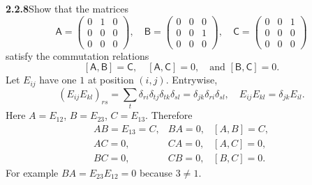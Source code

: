 \par\bigskip
\noindent\textbf{2.2.8}\quad Show that the matrices
\[
\mathsf{A}=\begin{pmatrix}0&1&0\\0&0&0\\0&0&0\end{pmatrix},\quad
\mathsf{B}=\begin{pmatrix}0&0&0\\0&0&1\\0&0&0\end{pmatrix},\quad
\mathsf{C}=\begin{pmatrix}0&0&1\\0&0&0\\0&0&0\end{pmatrix}
\]
satisfy the commutation relations
\[
[\mathsf{A},\mathsf{B}]=\mathsf{C},\quad[\mathsf{A},\mathsf{C}]=0,
\quad\text{and }[\mathsf{B},\mathsf{C}]=0.
\]
\solution
Let $E_{ij}$ have one $1$ at position $(i,j)$. Entrywise,
\[
(E_{ij}E_{kl})_{rs}
=\sum_t\delta_{ri}\delta_{tj}\delta_{tk}\delta_{sl}
=\delta_{jk}\delta_{ri}\delta_{sl},
\quad E_{ij}E_{kl}=\delta_{jk}E_{il}.
\]
Here $A=E_{12}$, $B=E_{23}$, $C=E_{13}$. Therefore
\[
\begin{array}{lll}
AB=E_{13}=C,&BA=0,&[A,B]=C,\\
AC=0,&CA=0,&[A,C]=0,\\
BC=0,&CB=0,&[B,C]=0.
\end{array}
\]
For example $BA=E_{23}E_{12}=0$ because $3\ne1$.

